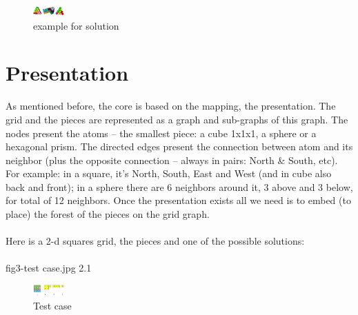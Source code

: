 \documentclass[a4paper,twoside,10pt]{report}
\begin{document}
\begin{figure}[p]
	\includegraphics[width=12mm]{fig2-example_for_solution.jpg}
	\caption{example for solution}
	\label{fig:example for solution}
\end{figure}

\chapter{Presentation}\label{Presentation}

As mentioned before, the core is based on the mapping, the presentation. The grid and the pieces are represented as a graph and sub-graphs of this graph. The nodes present the atoms – the smallest piece: a cube 1x1x1, a sphere or a hexagonal prism. The directed edges present the connection between atom and its neighbor (plus the opposite connection – always in pairs: North & South, etc). For example: in a square, it’s North, South, East and West (and in cube also back and front); in a sphere there are 6 neighbors around it, 3 above and 3 below, for total of 12 neighbors. Once the presentation exists all we need is to embed (to place) the forest of the pieces on the grid graph.
\\
\\
Here is a 2-d squares grid, the pieces and one of the possible solutions:
\\
\\
fig3-test case.jpg 2.1
\\
\begin{figure}[p]
	\includegraphics[width=12mm]{fig3-test_case.jpg}
	\caption{Test case}
	\label{fig:Test case}
\end{figure}
\end{document}
